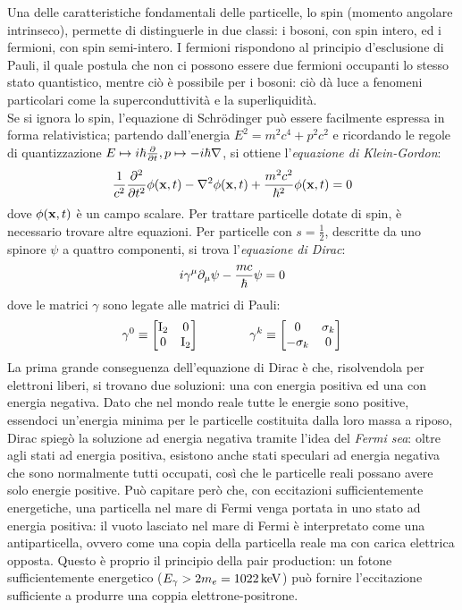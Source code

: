 Una delle caratteristiche fondamentali delle particelle, lo spin (momento angolare intrinseco), permette di distinguerle in due classi: i bosoni, con spin intero, ed i fermioni, con spin semi-intero. I fermioni rispondono al principio d'esclusione di Pauli, il quale postula che non ci possono essere due fermioni occupanti lo stesso stato quantistico, mentre ciò è possibile per i bosoni: ciò dà luce a fenomeni particolari come la superconduttività e la superliquidità.\\
Se si ignora lo spin, l'equazione di Schrödinger può essere facilmente espressa in forma relativistica; partendo dall'energia $ E^2 = m^2 c^4 + p^2 c^2 $ e ricordando le regole di quantizzazione $ E \mapsto i\hbar \frac{\partial}{\partial t}, p \mapsto -i\hbar \nabla $, si ottiene l'\textit{equazione di Klein-Gordon}:
\begin{equation}
	\frac{1}{c^2} \frac{\partial^2}{\partial t^2} \phi(\mathbf{x},t) - \nabla^2 \phi(\mathbf{x},t) + \frac{m^2 c^2}{\hbar^2} \phi(\mathbf{x},t) = 0
	\label{eq:7.1}
\end{equation}
dove $ \phi(\mathbf{x},t) $ è un campo scalare. Per trattare particelle dotate di spin, è necessario trovare altre equazioni. Per particelle con $ s = \frac{1}{2} $, descritte da uno spinore $ \psi $ a quattro componenti, si trova l'\textit{equazione di Dirac}:
\begin{equation}
	i \gamma^{\mu} \partial_{\mu} \psi - \frac{mc}{\hbar} \psi = 0
	\label{eq:7.2}
\end{equation}
dove le matrici $ \gamma $ sono legate alle matrici di Pauli:
\begin{equation*}
	\gamma^0 \equiv
	\begin{bmatrix}
		\mathrm{I}_2 & 0 \\ 0 & \mathrm{I}_2
	\end{bmatrix}
	\qquad \qquad
	\gamma^k \equiv
	\begin{bmatrix}
		0 & \sigma_k \\ -\sigma_k & 0
	\end{bmatrix}
\end{equation*}
La prima grande conseguenza dell'equazione di Dirac è che, risolvendola per elettroni liberi, si trovano due soluzioni: una con energia positiva ed una con energia negativa. Dato che nel mondo reale tutte le energie sono positive, essendoci un'energia minima per le particelle costituita dalla loro massa a riposo, Dirac spiegò la soluzione ad energia negativa tramite l'idea del \textit{Fermi sea}: oltre agli stati ad energia positiva, esistono anche stati speculari ad energia negativa che sono normalmente tutti occupati, così che le particelle reali possano avere solo energie positive. Può capitare però che, con eccitazioni sufficientemente energetiche, una particella nel mare di Fermi venga portata in uno stato ad energia positiva: il vuoto lasciato nel mare di Fermi è interpretato come una antiparticella, ovvero come una copia della particella reale ma con carica elettrica opposta. Questo è proprio il principio della pair production: un fotone sufficientemente energetico ($ E_{\gamma} > 2m_e = 1022\,\mathrm{keV} $) può fornire l'eccitazione sufficiente a produrre una coppia elettrone-positrone.\\
